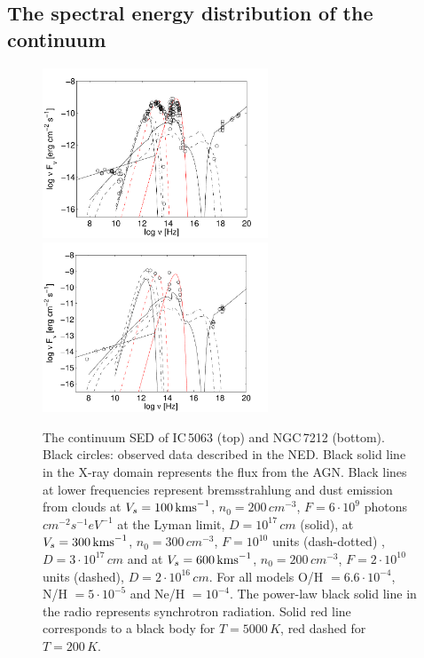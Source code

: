 \documentclass[../thesis.tex]{subfiles}
\begin{document}
\subsection{The spectral energy distribution of the continuum}

\begin{figure}
\includegraphics[width=0.6\textwidth]{images/paper1/sedic50.pdf}\\
\includegraphics[width=0.6\textwidth]{images/paper1/sedn72.pdf}
\caption{The continuum SED of IC\,5063 (top) and NGC\,7212 (bottom).
Black circles: observed data described in the NED.
Black solid line in the X-ray domain represents the flux from the AGN.
Black lines at lower frequencies represent bremsstrahlung and dust emission from clouds at $V_s=100\,\si{\kms}$, $n_0=200\,\si{cm^{-3}}$, $F=6 \cdot 10^9$ photons $\si{cm^{-2} s^{-1} eV^{-1}}$ at the Lyman limit, $ D=10^{17}\,\si{cm}$ (solid), at $V_s=300\,\si{\kms}$, $n_0=300 \,\si{cm^{-3}}$, $F= 10^{10}$ units (dash-dotted) , $ D=3\cdot10^{17}\,\si{ cm}$ and at $V_s= 600\,\si{\kms}$,  $n_0=200\,\si{cm^{-3}}$, $F=2\cdot10^{10}$  units (dashed), $ D=2\cdot10^{16}\,\si{ cm}$. 
For all models O/H $=6.6\cdot10^{-4}$, N/H $= 5\cdot10^{-5}$ and Ne/H $= 10^{-4}$.
The power-law black solid line in the radio represents synchrotron radiation.
Solid red line corresponds to a black body for $T=5000\,\si{K}$, red dashed for $T=200\,\si{K}$.}
\label{fig:SED}
\end{figure}
\end{document}

